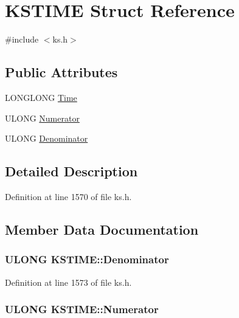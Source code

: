\hypertarget{struct_k_s_t_i_m_e}{}\section{K\+S\+T\+I\+ME Struct Reference}
\label{struct_k_s_t_i_m_e}


{\ttfamily \#include $<$ks.\+h$>$}

\subsection*{Public Attributes}
\begin{DoxyCompactItemize}
\item 
L\+O\+N\+G\+L\+O\+NG \hyperlink{struct_k_s_t_i_m_e_a93eaad26488e9e8ab3e5093f9caac839}{Time}
\item 
U\+L\+O\+NG \hyperlink{struct_k_s_t_i_m_e_acaf2a40ad30a361fffebb509e7f564de}{Numerator}
\item 
U\+L\+O\+NG \hyperlink{struct_k_s_t_i_m_e_aaf71d550df25184de8fb4c07e0a70f95}{Denominator}
\end{DoxyCompactItemize}


\subsection{Detailed Description}


Definition at line 1570 of file ks.\+h.



\subsection{Member Data Documentation}
\subsubsection[{\texorpdfstring{Denominator}{Denominator}}]{\setlength{\rightskip}{0pt plus 5cm}U\+L\+O\+NG K\+S\+T\+I\+M\+E\+::\+Denominator}\hypertarget{struct_k_s_t_i_m_e_aaf71d550df25184de8fb4c07e0a70f95}{}\label{struct_k_s_t_i_m_e_aaf71d550df25184de8fb4c07e0a70f95}


Definition at line 1573 of file ks.\+h.

\subsubsection[{\texorpdfstring{Numerator}{Numerator}}]{\setlength{\rightskip}{0pt plus 5cm}U\+L\+O\+NG K\+S\+T\+I\+M\+E\+::\+Numerator}\hypertarget{struct_k_s_t_i_m_e_acaf2a40ad30a361fffebb509e7f564de}{}\label{struct_k_s_t_i_m_e_acaf2a40ad30a361fffebb509e7f564de}


